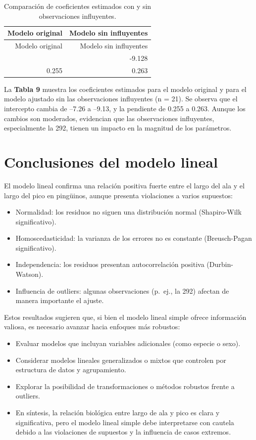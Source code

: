 \documentclass[
  spanish,
  11pt,
  a4paper,
  DIV=11,
  numbers=noendperiod]{scrartcl}
\begin{document}
\begin{longtable}[]{@{}rr@{}}
\caption{Comparación de coeficientes estimados con y sin observaciones
influyentes.}\tabularnewline
\toprule\noalign{}
Modelo original & Modelo sin influyentes \\
\midrule\noalign{}
\endfirsthead
\toprule\noalign{}
Modelo original & Modelo sin influyentes \\
\midrule\noalign{}
\endhead
\bottomrule\noalign{}
\endlastfoot
-7.265 & -9.128 \\
0.255 & 0.263 \\
\end{longtable}

La \textbf{Tabla 9} muestra los coeficientes estimados para el modelo
original y para el modelo ajustado sin las observaciones influyentes (n
= 21). Se observa que el intercepto cambia de --7.26 a --9.13, y la
pendiente de 0.255 a 0.263. Aunque los cambios son moderados, evidencian
que las observaciones influyentes, especialmente la 292, tienen un
impacto en la magnitud de los parámetros.

\section{Conclusiones del modelo
lineal}\label{conclusiones-del-modelo-lineal}

El modelo lineal confirma una relación positiva fuerte entre el largo
del ala y el largo del pico en pingüinos, aunque presenta violaciones a
varios supuestos:

\begin{itemize}
\item
  Normalidad: los residuos no siguen una distribución normal
  (Shapiro-Wilk significativo).
\item
  Homoscedasticidad: la varianza de los errores no es constante
  (Breusch-Pagan significativo).
\item
  Independencia: los residuos presentan autocorrelación positiva
  (Durbin-Watson).
\item
  Influencia de outliers: algunas observaciones (p.~ej., la 292) afectan
  de manera importante el ajuste.
\end{itemize}

Estos resultados sugieren que, si bien el modelo lineal simple ofrece
información valiosa, es necesario avanzar hacia enfoques más robustos:

\begin{itemize}
\item
  Evaluar modelos que incluyan variables adicionales (como especie o
  sexo).
\item
  Considerar modelos lineales generalizados o mixtos que controlen por
  estructura de datos y agrupamiento.
\item
  Explorar la posibilidad de transformaciones o métodos robustos frente
  a outliers.
\item
  En síntesis, la relación biológica entre largo de ala y pico es clara
  y significativa, pero el modelo lineal simple debe interpretarse con
  cautela debido a las violaciones de supuestos y la influencia de casos
  extremos.
\end{itemize}
\end{document}
